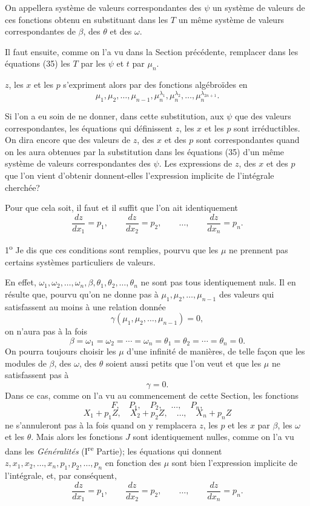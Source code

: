 \documentclass[11pt]{article}
\begin{document}
On appellera système de valeurs correspondantes des $\psi$ un système de valeurs de ces fonctions obtenu en substituant dans les $T$ un même système de valeurs correspondantes de $\beta$, des $\theta$ et des $\omega$.

Il faut ensuite, comme on l’a vu dans la Section précédente, remplacer dans les équations (35) les $T$ par les $\psi$ et $t$ par $\mu_n$.

$z$, les $x$ et les $p$ s’expriment alors par des fonctions algébroïdes en
\[
\mu_1,\mu_2,\ldots,\mu_{n-1},\mu_n^{\lambda_1},\mu_n^{\lambda_2},\ldots,\mu_n^{\lambda_{2n+1}}.
\]

Si l’on a eu soin de ne donner, dans cette substitution, aux $\psi$ que des valeurs correspondantes, les équations qui définissent $z$, les $x$ et les $p$ sont irréductibles. On dira encore que des valeurs de $z$, des $x$ et des $p$ sont correspondantes quand on les aura obtenues par la substitution dans les équations (35) d’un même système de valeurs correspondantes des $\psi$. Les expressions de $z$, des $x$ et des $p$ que l’on vient d’obtenir donnent-elles l’expression implicite de l’intégrale cherchée?

Pour que cela soit, il faut et il suffit que l’on ait identiquement
\[
\frac{dz}{dx_1}=p_1,\qquad \frac{dz}{dx_2}=p_2,\qquad \ldots,\qquad \frac{dz}{dx_n}=p_n.
\]

1\textsuperscript{o} Je dis que ces conditions sont remplies, pourvu que les $\mu$ ne prennent pas certains systèmes particuliers de valeurs.

En effet, $\omega_1,\omega_2,\ldots,\omega_n,\beta,\theta_1,\theta_2,\ldots,\theta_n$ ne sont pas tous identiquement nuls. Il en résulte que, pourvu qu’on ne donne pas à $\mu_1,\mu_2,\ldots,\mu_{n-1}$ des valeurs qui satisfassent au moins à une relation donnée
\[
\gamma(\mu_1,\mu_2,\ldots,\mu_{n-1})=0,
\]
on n’aura pas à la fois
\[
\beta=\omega_1=\omega_2=\cdots=\omega_n=\theta_1=\theta_2=\cdots=\theta_n=0.
\]
On pourra toujours choisir les $\mu$ d’une infinité de manières, de telle façon que les modules de $\beta$, des $\omega$, des $\theta$ soient aussi petits que l’on veut et que les $\mu$ ne satisfassent pas à
\[
\gamma=0.
\]
Dans ce cas, comme on l’a vu au commencement de cette Section, les fonctions
\[
F,\quad P_1,\quad P_2,\quad \ldots,\quad P_n,
\]
\[
X_1+p_1Z,\quad X_2+p_2Z,\quad \ldots,\quad X_n+p_nZ
\]
ne s’annuleront pas à la fois quand on y remplacera $z$, les $p$ et les $x$ par $\beta$, les $\omega$ et les $\theta$. Mais alors les fonctions $J$ sont identiquement nulles, comme on l’a vu dans les \emph{Généralités} (I\textsuperscript{re} Partie); les équations qui donnent $z,x_1,x_2,\ldots,x_n,p_1,p_2,\ldots,p_n$ en fonction des $\mu$ sont bien l’expression implicite de l’intégrale, et, par conséquent,
\[
\frac{dz}{dx_1}=p_1,\qquad \frac{dz}{dx_2}=p_2,\qquad \ldots,\qquad \frac{dz}{dx_n}=p_n.
\]
\end{document}
